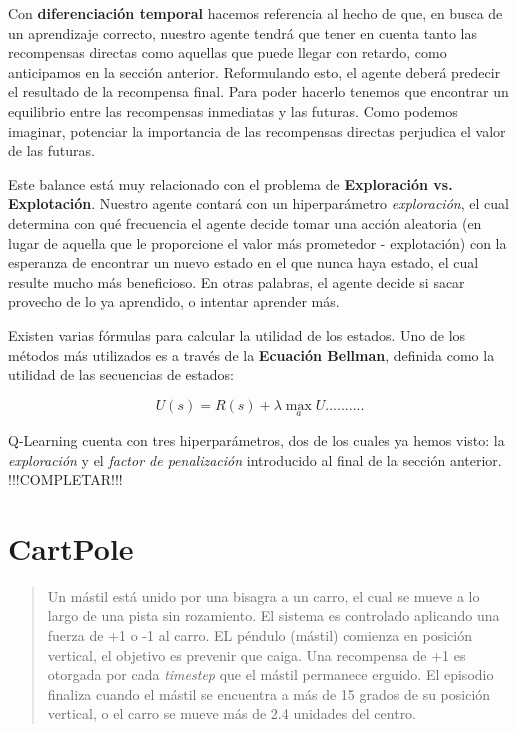 Con \textbf{diferenciación temporal} hacemos referencia al hecho de que, en busca de un aprendizaje correcto, nuestro agente tendrá que tener en cuenta tanto las recompensas directas como aquellas que puede llegar con retardo, como anticipamos en la sección anterior. Reformulando esto, el agente deberá predecir el resultado de la recompensa final. Para poder hacerlo tenemos que encontrar un equilibrio entre las recompensas inmediatas y las futuras. Como podemos imaginar, potenciar la importancia de las recompensas directas perjudica el valor de las futuras.

Este balance está muy relacionado con el problema de \textbf{Exploración vs. Explotación}. Nuestro agente contará con un hiperparámetro \textit{exploración}, el cual determina con qué frecuencia el agente decide tomar una acción aleatoria (en lugar de aquella que le proporcione el valor más prometedor - explotación) con la esperanza de encontrar un nuevo estado en el que nunca haya estado, el cual resulte mucho más beneficioso. En otras palabras, el agente decide si sacar provecho de lo ya aprendido, o intentar aprender más.

Existen varias fórmulas para calcular la utilidad de los estados. Uno de los métodos más utilizados es a través de la \textbf{Ecuación Bellman}, definida como la utilidad de las secuencias de estados:

\begin{equation}
    U(s) =  R(s) + \lambda\max_{a}U..........
\end{equation}

Q-Learning cuenta con tres hiperparámetros, dos de los cuales ya hemos visto: la \textit{exploración} y el \textit{factor de penalización} introducido al final de la sección anterior. !!!COMPLETAR!!!

\section{CartPole}
\begin{quote}
    Un mástil está unido por una bisagra a un carro, el cual se mueve a lo largo de una pista sin rozamiento. El sistema es controlado aplicando una fuerza de +1 o -1 al carro. EL péndulo (mástil) comienza en posición vertical, el objetivo es prevenir que caiga. Una recompensa de +1 es otorgada por cada \textit{timestep} que el mástil permanece erguido. El episodio finaliza cuando el mástil se encuentra a más de 15 grados de su posición vertical, o el carro se mueve más de 2.4 unidades del centro.
\end{quote}

